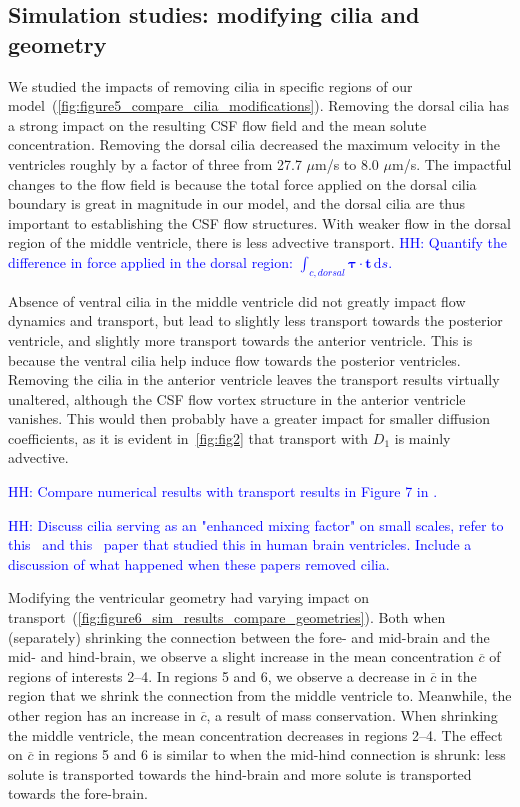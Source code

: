 \documentclass[fleqn]{wlscirep}
\newcommand{\btau}{\bm{\tau}}
\newcommand{\lyng}[1]{\textcolor{blue}{#1}}
\begin{document}
\subsection*{Simulation studies: modifying cilia and geometry}
We studied the impacts of removing cilia in specific regions of our model~(\cref{fig:figure5_compare_cilia_modifications}). Removing the dorsal cilia has a strong impact on the resulting CSF flow field and the mean solute concentration. Removing the dorsal cilia decreased the maximum velocity in the ventricles roughly by a factor of three from 27.7 $\mu$m/s to 8.0 $\mu$m/s. The impactful changes to the flow field is because the total force applied on the dorsal cilia boundary is great in magnitude in our model, and the dorsal cilia are thus important to establishing the CSF flow structures. With weaker flow in the dorsal region of the middle ventricle, there is less advective transport. \lyng{HH: Quantify the difference in force applied in the dorsal region: $\int_{c, dorsal}\btau\cdot\mathbf{t}\,\mathrm ds$.}

Absence of ventral cilia in the middle ventricle did not greatly impact flow dynamics and transport, but lead to slightly less transport towards the posterior ventricle, and slightly more transport towards the anterior ventricle. This is because the ventral cilia help induce flow towards the posterior ventricles. Removing the cilia in the anterior ventricle leaves the transport results virtually unaltered, although the CSF flow vortex structure in the anterior ventricle vanishes. This would then probably have a greater impact for smaller diffusion coefficients, as it is evident in~\cref{fig:fig2} that transport with $D_1$ is mainly advective.

\lyng{HH: Compare numerical results with transport results in Figure 7 in \cite{Olstad2019CiliaryDevelopment}.}


\lyng{HH: Discuss cilia serving as an "enhanced mixing factor" on small scales, refer to this~\cite{Siyahhan2014FlowVentricles} and this~\cite{Yoshida2022EffectVentricles} paper that studied this in human brain ventricles. Include a discussion of what happened when these papers removed cilia.}

Modifying the ventricular geometry had varying impact on transport~(\cref{fig:figure6_sim_results_compare_geometries}). Both when (separately) shrinking the connection between the fore- and mid-brain and the mid- and hind-brain, we observe a slight increase in the mean concentration $\overline{c}$ of regions of interests 2--4. In regions 5 and 6, we observe a decrease in $\overline{c}$ in the region that we shrink the connection from the middle ventricle to. Meanwhile, the other region has an increase in $\overline{c}$, a result of mass conservation. When shrinking the middle ventricle, the mean concentration decreases in regions 2--4. The effect on $\overline{c}$ in regions 5 and 6 is similar to when the mid-hind connection is shrunk: less solute is transported towards the hind-brain and more solute is transported towards the fore-brain. 
\end{document}
